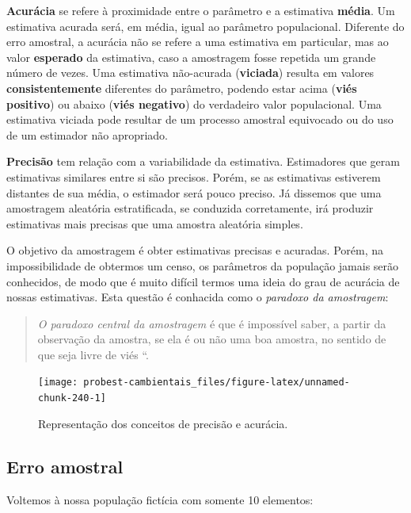 \documentclass[
]{book}
\begin{document}
\textbf{Acurácia} se refere à proximidade entre o parâmetro e a estimativa \textbf{média}. Um estimativa acurada será, em média, igual ao parâmetro populacional. Diferente do erro amostral, a acurácia não se refere a uma estimativa em particular, mas ao valor \textbf{esperado} da estimativa, caso a amostragem fosse repetida um grande número de vezes.
Uma estimativa não-acurada (\textbf{viciada}) resulta em valores \textbf{consistentemente} diferentes do parâmetro, podendo estar acima (\textbf{viés positivo}) ou abaixo (\textbf{viés negativo}) do verdadeiro valor populacional. Uma estimativa viciada pode resultar de um processo amostral equivocado ou do uso de um estimador não apropriado.

\textbf{Precisão} tem relação com a variabilidade da estimativa. Estimadores que geram estimativas similares entre si são precisos. Porém, se as estimativas estiverem distantes de sua média, o estimador será pouco preciso. Já dissemos que uma amostragem aleatória estratificada, se conduzida corretamente, irá produzir estimativas mais precisas que uma amostra aleatória simples.

O objetivo da amostragem é obter estimativas precisas e acuradas. Porém, na impossibilidade de obtermos um censo, os parâmetros da população jamais serão conhecidos, de modo que é muito difícil termos uma ideia do grau de acurácia de nossas estimativas. Esta questão é conhacida como o \emph{paradoxo da amostragem}:

\begin{quote}
\emph{O paradoxo central da amostragem} é que é impossível saber, a partir da observação da amostra, se ela é ou não uma boa amostra, no sentido de que seja livre de viés \citep{stuart1984ideas}``.
\end{quote}

\begin{figure}

{\centering \texttt{[image: probest-cambientais\_files/figure-latex/unnamed-chunk-240-1]} 

}

\caption{Representação dos conceitos de precisão e acurácia.}\label{fig:unnamed-chunk-240}
\end{figure}

\hypertarget{erro-amostral}{%
\subsection{Erro amostral}\label{erro-amostral}}

Voltemos à nossa população fictícia com somente 10 elementos:
\end{document}
